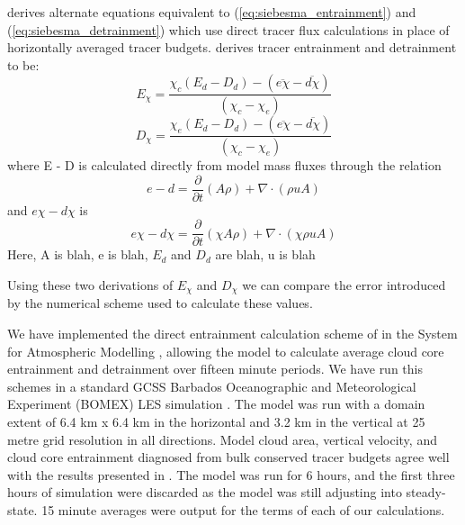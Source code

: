 \documentclass[draft,grl]{AGUTeX}
\begin{document}
\begin{article}
\cite{Romps2010} derives alternate equations equivalent to 
(\ref{eq:siebesma_entrainment}) and (\ref{eq:siebesma_detrainment}) which use
direct tracer flux calculations in place of horizontally averaged tracer 
budgets.  \cite{Romps2010} derives tracer entrainment and detrainment to be:
\begin{equation}
  \label{eq:romps_entrainment}
  E_{\chi} = \frac{\chi_{c}(E_d-D_d) - (\overline{e\chi} - \overline{d\chi})}{(\chi_{c} - \chi_{e})}
\end{equation}
\begin{equation}
  \label{eq:romps_detrainment}
  D_{\chi} = \frac{\chi_{e}(E_d-D_d) - (\overline{e\chi} - \overline{d\chi})}{(\chi_{c} - \chi_{e})}
\end{equation}
where E - D is calculated directly from model mass fluxes through the relation
\begin{equation}
  \label{eq:romps_e_minus_d}
  e - d = \frac{\partial}{\partial t}(A\rho) + \nabla \cdot (\rho u A) 
\end{equation}
and $e\chi - d\chi$ is 
\begin{equation}
  \label{eq:romps_e_minus_d}
  e\chi - d\chi = \frac{\partial}{\partial t}(\chi A \rho) + \nabla \cdot (\chi \rho u A) 
\end{equation}
Here, A is blah, e is blah, $E_d$ and $D_d$ are blah, u is blah

Using these two derivations of $E_{\chi}$ and $D_{\chi}$ we can compare the 
error introduced by the numerical scheme used to calculate these values.

We have implemented the direct entrainment calculation scheme of 
\cite{Romps2010} in the System for Atmospheric Modelling 
\citep[SAM;][]{Khairoutdinov2003}, allowing the model to calculate average 
cloud core entrainment and detrainment over fifteen minute periods.  We have 
run this schemes in a standard GCSS Barbados Oceanographic and Meteorological 
Experiment (BOMEX) LES simulation \citep{Holland1973, Siebesma2003}.  
The model was run with a domain extent of 6.4 km x 6.4 km in the horizontal and 
3.2 km in the vertical at 25 metre grid resolution in all directions.  Model 
cloud area, vertical velocity, and cloud core entrainment diagnosed from bulk 
conserved tracer budgets agree well with the results presented in 
\cite{Siebesma2003}.  The model was run for 6 hours, and the first three hours 
of simulation were discarded as the model was still adjusting into 
steady-state.  15 minute averages were output for the terms of each of our 
calculations.


\end{article}
\end{document}
